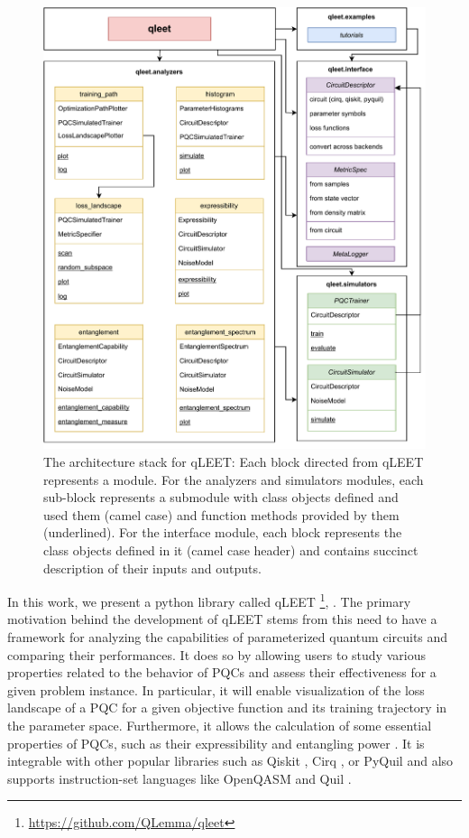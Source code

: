 \documentclass[%
 reprint,
 amsmath,
 amssymb,
 showkeys,
 pra,
 floatfix,
]{revtex4-2}
\begin{document}
\begin{figure}[!th]
    \centering
    \includegraphics[width=0.65\linewidth]{images/qleet-architecture.pdf}
    \caption{The architecture stack for qLEET: Each block directed from qLEET represents a module. For the analyzers and simulators modules, each sub-block represents a submodule with class objects defined and used them (camel case) and function methods provided by them (underlined). For the interface module, each block represents the class objects defined in it (camel case header) and contains succinct description of their inputs and outputs.}
    \label{fig:qleet-architecture}
\end{figure}

In this work, we present a python library called qLEET \footnote{\href{https://github.com/QLemma/qleet}{https://github.com/QLemma/qleet}}, \cite{qleet-zenodo}. The primary motivation behind the development of qLEET stems from this need to have a framework for analyzing the capabilities of parameterized quantum circuits and comparing their performances. It does so by allowing users to study various properties related to the behavior of PQCs and assess their effectiveness for a given problem instance. In particular, it will enable visualization of the loss landscape of a PQC for a given objective function and its training trajectory in the parameter space. Furthermore, it allows the calculation of some essential properties of PQCs, such as their expressibility and entangling power \cite{10.1002/qute.201900070}. It is integrable with other popular libraries such as Qiskit \cite{comp_qiskit}, Cirq \cite{comp_cirq}, or PyQuil \cite{ccquad_Pyquil} and also supports instruction-set languages like OpenQASM \cite{2021arXiv210414722C} and Quil \cite{ccquad_Pyquil}.
\end{document}
